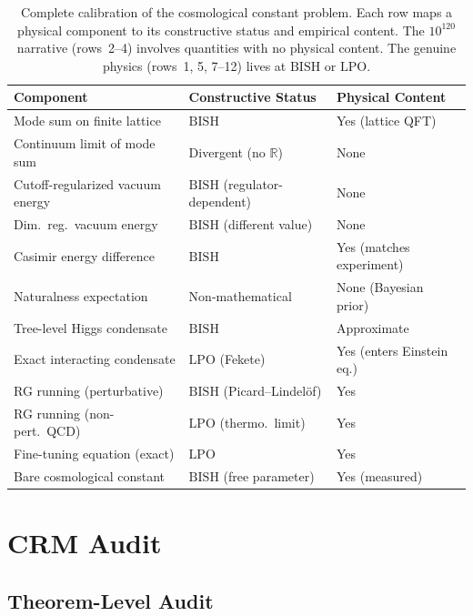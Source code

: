 \documentclass[11pt,a4paper]{article}
\theoremstyle{plain}
\theoremstyle{definition}
\newcommand{\RR}{\mathbb{R}}
\newcommand{\LPO}{\ensuremath{\mathrm{LPO}}}
\newcommand{\BISH}{\ensuremath{\mathrm{BISH}}}
\begin{document}
\begin{table}[ht]
\centering
\begin{tabular}{@{}lll@{}}
\toprule
\textbf{Component} & \textbf{Constructive Status} & \textbf{Physical Content} \\
\midrule
Mode sum on finite lattice & $\BISH$ & Yes (lattice QFT) \\
Continuum limit of mode sum & Divergent (no $\RR$) & None \\
Cutoff-regularized vacuum energy & $\BISH$ (regulator-dependent) & None \\
Dim.\ reg.\ vacuum energy & $\BISH$ (different value) & None \\
Casimir energy difference & $\BISH$ & Yes (matches experiment) \\
Naturalness expectation & Non-mathematical & None (Bayesian prior) \\
Tree-level Higgs condensate & $\BISH$ & Approximate \\
Exact interacting condensate & $\LPO$ (Fekete) & Yes (enters Einstein eq.) \\
RG running (perturbative) & $\BISH$ (Picard--Lindel\"of) & Yes \\
RG running (non-pert.\ QCD) & $\LPO$ (thermo.\ limit) & Yes \\
Fine-tuning equation (exact) & $\LPO$ & Yes \\
Bare cosmological constant & $\BISH$ (free parameter) & Yes (measured) \\
\bottomrule
\end{tabular}
\caption{Complete calibration of the cosmological constant problem.
  Each row maps a physical component to its constructive status and
  empirical content.  The $10^{120}$ narrative (rows~2--4) involves
  quantities with no physical content.  The genuine physics (rows~1,
  5, 7--12) lives at $\BISH$ or $\LPO$.}
\label{tab:calibration}
\end{table}

\section{CRM Audit}\label{sec:audit}

\subsection{Theorem-Level Audit}
\end{document}
